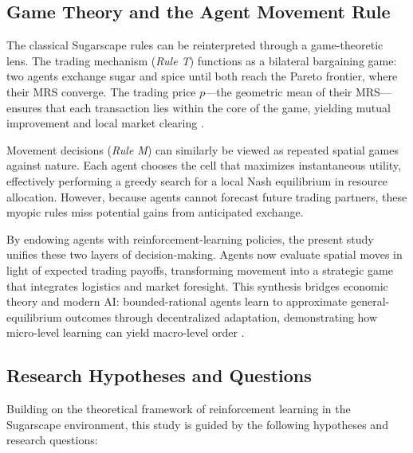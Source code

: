 \documentclass[pdflatex,sn-mathphys-num]{sn-jnl}%
\theoremstyle{thmstyleone}%
\theoremstyle{thmstyletwo}%
\theoremstyle{thmstylethree}%
\begin{document}

\subsection{Game Theory and the Agent Movement Rule}
The classical Sugarscape rules can be reinterpreted through a game-theoretic lens.  
The trading mechanism (\textit{Rule T}) functions as a bilateral bargaining game: two agents exchange sugar and spice until both reach the Pareto frontier, where their MRS converge.  
The trading price \(p\)—the geometric mean of their MRS—ensures that each transaction lies within the core of the game, yielding mutual improvement and local market clearing \citep{EpsteinAxtell1996}.

Movement decisions (\textit{Rule M}) can similarly be viewed as repeated spatial games against nature.  
Each agent chooses the cell that maximizes instantaneous utility, effectively performing a greedy search for a local Nash equilibrium in resource allocation.  
However, because agents cannot forecast future trading partners, these myopic rules miss potential gains from anticipated exchange.
    
By endowing agents with reinforcement-learning policies, the present study unifies these two layers of decision-making.  
Agents now evaluate spatial moves in light of expected trading payoffs, transforming movement into a strategic game that integrates logistics and market foresight.  
This synthesis bridges economic theory and modern AI: bounded-rational agents learn to approximate general-equilibrium outcomes through decentralized adaptation, demonstrating how micro-level learning can yield macro-level order \citep{Leibo2017, Hughes2018, Zheng2022}.


\subsection{Research Hypotheses and Questions}
Building on the theoretical framework of reinforcement learning in the Sugarscape environment, this study is guided by the following hypotheses and research questions:
\end{document}
